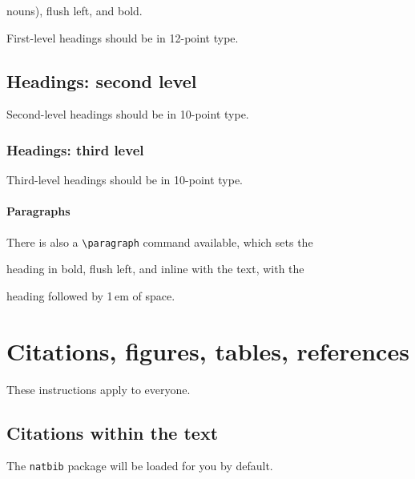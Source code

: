 \documentclass{article}
\begin{document}
nouns), flush left, and bold.



First-level headings should be in 12-point type.



\subsection{Headings: second level}



Second-level headings should be in 10-point type.



\subsubsection{Headings: third level}



Third-level headings should be in 10-point type.



\paragraph{Paragraphs}



There is also a \verb+\paragraph+ command available, which sets the

heading in bold, flush left, and inline with the text, with the

heading followed by 1\,em of space.



\section{Citations, figures, tables, references}

\label{others}



These instructions apply to everyone.



\subsection{Citations within the text}



The \verb+natbib+ package will be loaded for you by default.
\end{document}
